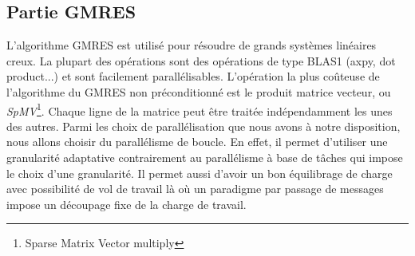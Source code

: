 \subsection{Partie GMRES}
L'algorithme GMRES est utilisé pour résoudre de grands systèmes linéaires creux.
%
La plupart des opérations sont des opérations de type BLAS1 (axpy, dot product...) et sont facilement parallélisables\cite{para_blas}.
%
L'opération la plus coûteuse de l'algorithme du GMRES non préconditionné est le produit matrice vecteur, ou {\em SpMV}\footnote{Sparse Matrix Vector multiply}.
%
Chaque ligne de la matrice peut être traitée indépendamment les unes des autres.
%
Parmi les choix de parallélisation que nous avons à notre disposition, nous allons choisir du parallélisme de boucle\cite{para_spmv}.
%
En effet, il permet d'utiliser une granularité adaptative contrairement au parallélisme à base de tâches qui impose le choix d'une granularité.
%
Il permet aussi d'avoir un bon équilibrage de charge avec possibilité de vol de travail là où un paradigme par passage de messages impose un découpage fixe de la charge de travail.




